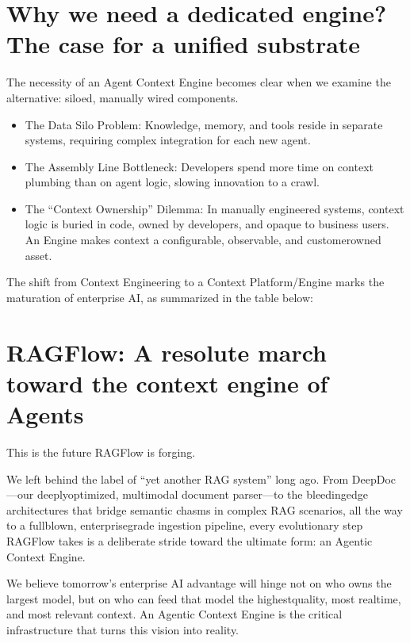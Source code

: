 \documentclass[letterpaper,10pt,english]{sphinxmanual}
\begin{document}
\section{Why we need a dedicated engine? The case for a unified substrate}
\label{\detokenize{agent-context-engine:why-we-need-a-dedicated-engine-the-case-for-a-unified-substrate}}
\sphinxAtStartPar
The necessity of an Agent Context Engine becomes clear when we examine the alternative: siloed, manually wired components.
\begin{itemize}
\item {} 
\sphinxAtStartPar
The Data Silo Problem: Knowledge, memory, and tools reside in separate systems, requiring complex integration for each new agent.

\item {} 
\sphinxAtStartPar
The Assembly Line Bottleneck: Developers spend more time on context plumbing than on agent logic, slowing innovation to a crawl.

\item {} 
\sphinxAtStartPar
The “Context Ownership” Dilemma: In manually engineered systems, context logic is buried in code, owned by developers, and opaque to business users. An Engine makes context a configurable, observable, and customer\sphinxhyphen{}owned asset.

\end{itemize}

\sphinxAtStartPar
The shift from Context Engineering to a Context Platform/Engine marks the maturation of enterprise AI, as summarized in the table below:


\section{RAGFlow: A resolute march toward the context engine of Agents}
\label{\detokenize{agent-context-engine:ragflow-a-resolute-march-toward-the-context-engine-of-agents}}
\sphinxAtStartPar
This is the future RAGFlow is forging.

\sphinxAtStartPar
We left behind the label of “yet another RAG system” long ago. From DeepDoc—our deeply\sphinxhyphen{}optimized, multimodal document parser—to the bleeding\sphinxhyphen{}edge architectures that bridge semantic chasms in complex RAG scenarios, all the way to a full\sphinxhyphen{}blown, enterprise\sphinxhyphen{}grade ingestion pipeline, every evolutionary step RAGFlow takes is a deliberate stride toward the ultimate form: an Agentic Context Engine.

\sphinxAtStartPar
We believe tomorrow’s enterprise AI advantage will hinge not on who owns the largest model, but on who can feed that model the highest\sphinxhyphen{}quality, most real\sphinxhyphen{}time, and most relevant context. An Agentic Context Engine is the critical infrastructure that turns this vision into reality.
\end{document}
